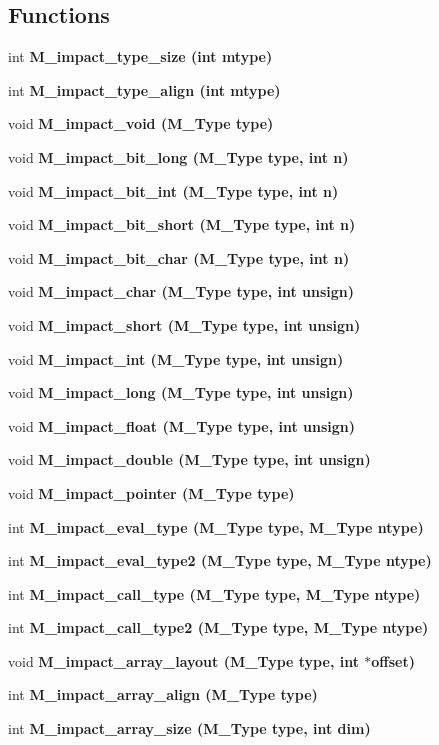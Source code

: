 \subsection*{Functions}
\begin{CompactItemize}
\item 
int \bf{M\_\-impact\_\-type\_\-size} (int mtype)
\item 
int \bf{M\_\-impact\_\-type\_\-align} (int mtype)
\item 
void \bf{M\_\-impact\_\-void} (\bf{M\_\-Type} type)
\item 
void \bf{M\_\-impact\_\-bit\_\-long} (\bf{M\_\-Type} type, int n)
\item 
void \bf{M\_\-impact\_\-bit\_\-int} (\bf{M\_\-Type} type, int n)
\item 
void \bf{M\_\-impact\_\-bit\_\-short} (\bf{M\_\-Type} type, int n)
\item 
void \bf{M\_\-impact\_\-bit\_\-char} (\bf{M\_\-Type} type, int n)
\item 
void \bf{M\_\-impact\_\-char} (\bf{M\_\-Type} type, int unsign)
\item 
void \bf{M\_\-impact\_\-short} (\bf{M\_\-Type} type, int unsign)
\item 
void \bf{M\_\-impact\_\-int} (\bf{M\_\-Type} type, int unsign)
\item 
void \bf{M\_\-impact\_\-long} (\bf{M\_\-Type} type, int unsign)
\item 
void \bf{M\_\-impact\_\-float} (\bf{M\_\-Type} type, int unsign)
\item 
void \bf{M\_\-impact\_\-double} (\bf{M\_\-Type} type, int unsign)
\item 
void \bf{M\_\-impact\_\-pointer} (\bf{M\_\-Type} type)
\item 
int \bf{M\_\-impact\_\-eval\_\-type} (\bf{M\_\-Type} type, \bf{M\_\-Type} ntype)
\item 
int \bf{M\_\-impact\_\-eval\_\-type2} (\bf{M\_\-Type} type, \bf{M\_\-Type} ntype)
\item 
int \bf{M\_\-impact\_\-call\_\-type} (\bf{M\_\-Type} type, \bf{M\_\-Type} ntype)
\item 
int \bf{M\_\-impact\_\-call\_\-type2} (\bf{M\_\-Type} type, \bf{M\_\-Type} ntype)
\item 
void \bf{M\_\-impact\_\-array\_\-layout} (\bf{M\_\-Type} type, int $\ast$offset)
\item 
int \bf{M\_\-impact\_\-array\_\-align} (\bf{M\_\-Type} type)
\item 
int \bf{M\_\-impact\_\-array\_\-size} (\bf{M\_\-Type} type, int dim)

\end{CompactItemize}

